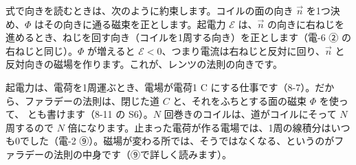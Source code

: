 式で向きを読むときは、次のように約束します。コイルの面の向き $\vec n$ を1つ決め、$\Phi$ はその向きに通る磁束を正とします。起電力 $\mathcal E$ は、$\vec n$ の向きに右ねじを進めるとき、ねじを回す向き（コイルを1周する向き）を正とします（電-6 ② の右ねじと同じ）。$\Phi$ が増えると $\mathcal E<0$、つまり電流は右ねじと反対に回り、$\vec n$ と反対向きの磁場を作ります。これが、レンツの法則の向きです。

起電力は、電荷を1周運ぶとき、電場が電荷1 C にする仕事です（8-7）。だから、ファラデーの法則は、閉じた道 $C$ と、それをふちとする面の磁束 $\Phi$ を使って、
とも書けます（8-11 の S6）。$N$ 回巻きのコイルは、道がコイルにそって $N$ 周するので $N$ 倍になります。止まった電荷が作る電場では、1周の線積分はいつも0でした（電-2 ⑨）。磁場が変わる所では、そうではなくなる、というのがファラデーの法則の中身です（⑨で詳しく読みます）。

\begin{phflow}
\end{phflow}

